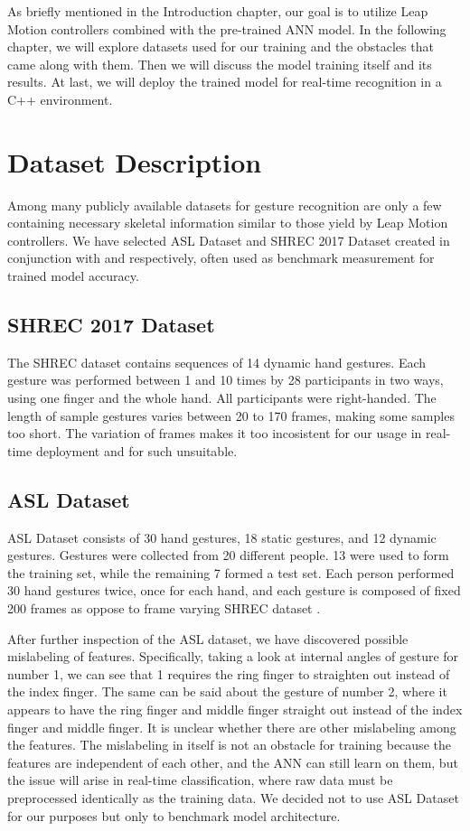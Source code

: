 
As briefly mentioned in the Introduction chapter, our goal is to utilize Leap Motion controllers combined with the pre-trained ANN model. In the following chapter, we will explore datasets used for our training and the obstacles that came along with them. Then we will discuss the model training itself and its results. At last, we will deploy the trained model for real-time recognition in a C++ environment.


\section{Dataset Description}

Among many publicly available datasets for gesture recognition are only a few containing necessary skeletal information similar to those yield by Leap Motion controllers. We have selected ASL Dataset and SHREC 2017 Dataset created in conjunction with \cite{avola} and \cite{shrec} respectively, often used as benchmark measurement for trained model accuracy.

\subsection{SHREC 2017 Dataset}

The SHREC dataset contains sequences of 14 dynamic hand gestures. Each gesture was performed between 1 and 10 times by 28 participants in two ways, using one finger and the whole hand. All participants were right-handed. The length of sample gestures varies between 20 to 170 frames, making some samples too short. The variation of frames makes it too incosistent for our usage in real-time deployment and for such unsuitable.

\subsection{ASL Dataset}

ASL Dataset consists of 30 hand gestures, 18 static gestures, and 12 dynamic gestures. Gestures were collected from 20 different people. 13 were used to form the training set, while the remaining 7 formed a test set. Each person performed 30 hand gestures twice, once for each hand, and each gesture is composed of fixed 200 frames as oppose to frame varying SHREC dataset \cite{avola}. 

After further inspection of the ASL dataset, we have discovered possible mislabeling of features. Specifically, taking a look at internal angles of gesture for number 1, we can see that 1 requires the ring finger to straighten out instead of the index finger. The same can be said about the gesture of number 2, where it appears to have the ring finger and middle finger straight out instead of the index finger and middle finger. It is unclear whether there are other mislabeling among the features. The mislabeling in itself is not an obstacle for training because the features are independent of each other, and the ANN can still learn on them, but the issue will arise in real-time classification, where raw data must be preprocessed identically as the training data. We decided not to use ASL Dataset for our purposes but only to benchmark model architecture.


